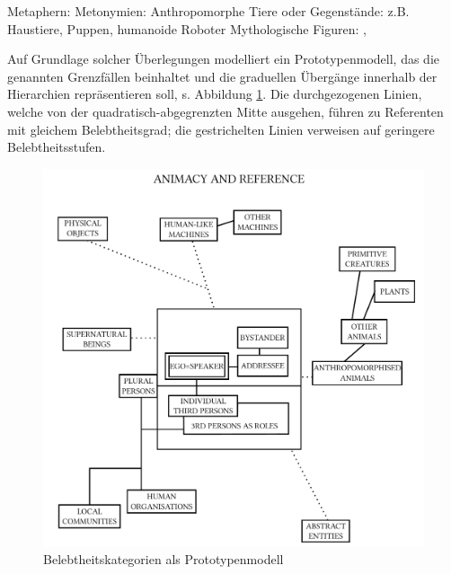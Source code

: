 \begin{exe}
	\ex \label{ex:borderlines}
	\begin{xlist}
		\ex \label{ex:metapher} Metaphern: 
 		\ex \label{ex:metonymie} Metonymien: 
		\ex \label{ex:anthropo} Anthropomorphe Tiere oder Gegenstände: z.B. Haustiere, Puppen, humanoide Roboter	
		\ex \label{ex:mytho} Mythologische Figuren: , 
	\end{xlist}
\end{exe}
\noindent
Auf Grundlage solcher Überlegungen modelliert \textcite{Yamamoto1999} ein Prototypenmodell, das die genannten Grenzfällen beinhaltet und die graduellen Übergänge innerhalb der Hierarchien repräsentieren soll, s. Abbildung \ref{yamamoto}. Die durchgezogenen Linien, welche von der quadratisch-abgegrenzten Mitte ausgehen, führen zu Referenten mit gleichem Belebtheitsgrad; die gestrichelten Linien verweisen auf geringere Belebtheitsstufen.

\begin{figure}[p]
\includegraphics[width=\textwidth]{images/yamamoto2.pdf}
\caption {Belebtheitskategorien als Prototypenmodell \parencite[aus][38]{Yamamoto1999}\label{yamamoto}}
\end{figure} 


